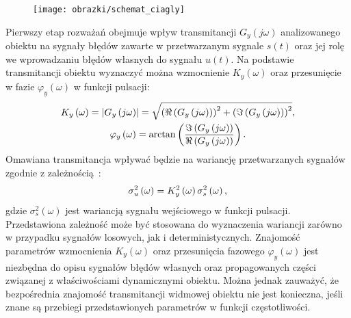 \begin{figure}[htb!]
\begin{center}
\texttt{[image: obrazki/schemat\_ciagly]}
\end{center}
\end{figure}

Pierwszy etap rozważań obejmuje wpływ transmitancji $G_{y}(j\omega)$ analizowanego obiektu na sygnały błędów zawarte w przetwarzanym sygnale $s(t)$ oraz jej rolę we wprowadzaniu błędów własnych do sygnału $u(t)$. Na podstawie transmitancji obiektu wyznaczyć można wzmocnienie $K_{y}(\omega)$ oraz przesunięcie w fazie $\varphi_{y}(\omega)$ w funkcji pulsacji:
\begin{gather}
K_{y} \left(\omega\right) = \left| G_{y} \left(j\omega\right) \right| =
	\sqrt{\left( \Re \left( G_{y} \left(j\omega\right) \right) \right)^{2} +
	\left( \Im \left( G_{y} \left(j\omega\right) \right) \right)^{2}}
\label{eq:mid_cont_amp}, \\
\varphi_{y} \left(\omega\right) = \arctan \left( \frac{\Im \left( G_{y} \left(j\omega\right) \right)}{\Re \left( G_{y} \left(j\omega\right) \right)} \right) \label{eq:mid_cont_phi}.
\end{gather}
Omawiana transmitancja wpływać będzie na wariancję przetwarzanych sygnałów zgodnie z zależnością~\cite{oppenheim_sns}:
\begin{equation}
\sigma_{u}^{2} \left(\omega\right) = K_{y}^{2} \left(\omega\right) \sigma_{s}^{2} \left(\omega\right) \label{eq:mid_cont_var_omega},
\end{equation}
gdzie $\sigma_{s}^{2}(\omega)$ jest wariancją sygnału wejściowego w funkcji pulsacji. Przedstawiona zależność może być stosowana do wyznaczenia wariancji zarówno w przypadku sygnałów losowych, jak i deterministycznych. Znajomość parametrów wzmocnienia $K_{y}(\omega)$ oraz przesunięcia fazowego $\varphi_{y}(\omega)$ jest niezbędna do opisu sygnałów błędów własnych oraz propagowanych części związanej z właściwościami dynamicznymi obiektu. Można jednak zauważyć, że bezpośrednia znajomość transmitancji widmowej obiektu nie jest konieczna, jeśli znane są przebiegi przedstawionych parametrów w funkcji częstotliwości.

